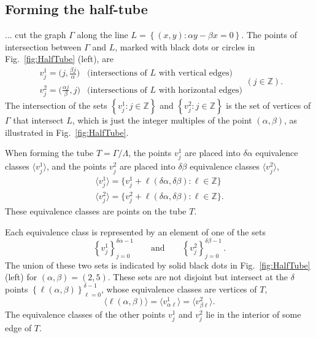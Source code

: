 \documentclass[12pt]{article}
\newcommand{\ZZ}{\mathbb{Z}}
\begin{document}
\subsection{Forming the half-tube}\label{sec:cutting}  %

... cut the graph $\Gamma$ along the line $L=\left\{ (x,y): \alpha y - \beta x = 0 \right\}$.  The points of intersection between $\Gamma$ and $L$, marked with black dots or circles in Fig.~\ref{fig:HalfTube} (left), are
%
\begin{equation}
  \renewcommand{\arraystretch}{1.1}
\left.
\begin{array}{ll}
  v^1_j = \big( j,\frac{\beta j}{\alpha} \big) & \text{(intersections of $L$ with vertical edges)} \\
  v^2_j = \big( \frac{\alpha j}{\beta}, j \big) & \text{(intersections of $L$ with horizontal edges)}
\end{array}
\right.
(j\in\ZZ).
\end{equation}
%
The intersection of the sets $\left\{ v^1_j : j\in\ZZ \right\}$ and $\left\{ v^2_j : j\in\ZZ \right\}$ is the set of vertices of $\Gamma$ that intersect $L$, which is just the integer multiples of the point $(\alpha,\beta)$, as illustrated in Fig.~\ref{fig:HalfTube}.

When forming the tube $T = \Gamma/\Lambda$, the points $v^1_j$ are placed into $\delta\alpha$ equivalence classes $\langle v^1_j \rangle$, 
and the points $v^2_j$ are placed into $\delta\beta$ equivalence classes $\langle v^2_j \rangle$,
%
\begin{equation}
\renewcommand{\arraystretch}{1.1}
\left.
\begin{array}{l}
    \langle v^1_j \rangle = \{ v^1_j + \ell (\delta\alpha,\delta\beta):\ell\in\ZZ\} \\
    \langle v^2_j \rangle = \{ v^2_j + \ell (\delta\alpha,\delta\beta):\ell\in\ZZ\}.
\end{array}
\right.
\end{equation}
%
These equivalence classes are points on the tube $T$.

Each equivalence class is represented by an element of one of the sets
%
\begin{equation}
  \left\{ v^1_j \right\}_{j=0}^{\delta\alpha-1}
  \qquad \text{and} \qquad
  \left\{ v^2_j \right\}_{j=0}^{\delta\beta-1}\,.
\end{equation}
%
The union of these two sets is indicated by solid black dots in Fig.~\ref{fig:HalfTube} (left) for $(\alpha,\beta)=(2,5)$.
These sets are not disjoint but intersect at the $\delta$ points $\left\{ \ell(\alpha,\beta) \right\}_{\ell=0}^{\delta-1}$, whose equivalence classes are vertices of $T$,
%
\begin{equation}
  \langle \ell(\alpha,\beta) \rangle
  = \langle v^1_{\alpha\ell} \rangle
  = \langle v^2_{\beta\ell} \rangle.
\end{equation}
%
The equivalence classes of the other points $v^1_j$ and $v^2_j$ lie in the interior of some edge of $T$.
\end{document}
